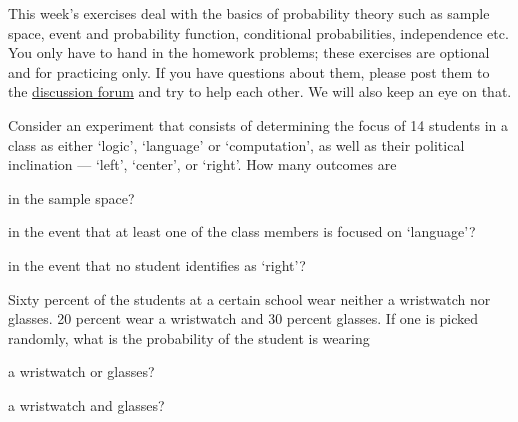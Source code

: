 \documentclass[a4paper,10pt,landscape,twocolumn]{scrartcl}
\begin{document}
\practiceproblems

{\sffamily\noindent
This week's exercises deal with the basics of probability theory such
as sample space, event and probability function, conditional
probabilities, independence etc. You only have to hand in the homework problems; these exercises are optional and for practicing only. 
If you have questions about them, please post them to the \href{\discussionForumURL}{discussion forum} and try to help each other. We will also keep an eye on that.
}



\begin{exercise}[]
	 Consider an experiment that consists of determining the focus of 14 students in a class as either `logic', `language' or `computation', as well as their political inclination --- `left', `center', or `right'. How many outcomes are
	 
	 \begin{subex}
	 	in the sample space?
	 \end{subex}
	 
	 \begin{subex}
	 	in the event that at least one of the class members is focused on `language'?
	 \end{subex}
	 
	 \begin{subex}
	 	in the event that no student identifies as `right'?
	 \end{subex}
\end{exercise}

\begin{exercise}[]
	 Sixty percent of the students at a certain school wear neither a wristwatch nor glasses. 20 percent wear a wristwatch and 30 percent glasses. If one is picked randomly, what is the probability of the student is wearing
	
	\begin{subex}
		a wristwatch or glasses?
	\end{subex}
	
	\begin{subex}
		a wristwatch and glasses?
	\end{subex}
		
\end{exercise}
\end{document}
